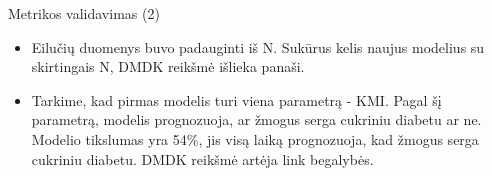 \begin{frame}[c]{Metrikos validavimas (2)}
 
\begin{itemize}
    \item Eilučių duomenys buvo padauginti iš N. Sukūrus kelis naujus modelius su skirtingais N, DMDK reikšmė išlieka panaši.
    \item Tarkime, kad pirmas modelis turi viena parametrą - KMI. Pagal šį parametrą, modelis prognozuoja, ar žmogus serga cukriniu diabetu ar ne. Modelio tikslumas yra 54\%, jis visą laiką prognozuoja, kad žmogus serga cukriniu diabetu. DMDK reikšmė artėja link begalybės.
\end{itemize}

\end{frame}